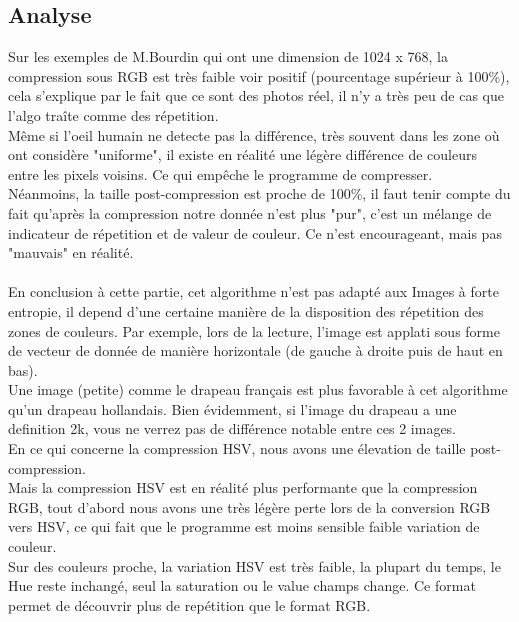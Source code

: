 \documentclass[12pt, letterpaper]{article}
\begin{document}
\subsection{Analyse}
\hspace{1cm}Sur les exemples de M.Bourdin qui ont une dimension de 1024 x 768, la compression sous RGB est très faible voir positif 
(pourcentage supérieur à 100\%), cela s'explique par le fait que ce sont des photos réel, 
il n'y a très peu de cas que l'algo traîte comme des répetition.\\
Même si l'oeil humain ne detecte pas la différence, très souvent dans les zone où ont considère "uniforme", 
il existe en réalité une légère différence de couleurs entre les pixels voisins. Ce qui empêche le programme de compresser.\\
Néanmoins, la taille post-compression est proche de 100\%, il faut tenir compte du fait qu'après la compression notre donnée n'est 
plus "pur", c'est un mélange de indicateur de répetition et de valeur de couleur. Ce n'est encourageant, mais pas "mauvais" en réalité.\\
\\\hspace{1cm}En conclusion à cette partie, cet algorithme n'est pas adapté aux Images à forte entropie, il depend 
d'une certaine manière de la disposition des répetition des zones de couleurs. 
Par exemple, lors de la lecture, l'image est applati sous forme de vecteur de donnée de manière horizontale 
(de gauche à droite puis de haut en bas).\\
Une image (petite) comme le drapeau français est plus favorable à cet algorithme 
qu'un drapeau hollandais. Bien évidemment, si l'image du drapeau a une definition 2k, vous ne verrez pas de différence notable 
entre ces 2 images.
\break
\\
En ce qui concerne la compression HSV, nous avons une élevation de taille post-compression.\\
Mais la compression HSV est en réalité plus performante que la compression RGB, 
tout d'abord nous avons une très légère perte lors de la conversion RGB vers HSV, ce qui fait que 
le programme est moins sensible faible variation de couleur.\\
Sur des couleurs proche, la variation HSV est très faible, la plupart du temps, le Hue reste inchangé, 
seul la saturation ou le value champs change. Ce format permet de découvrir plus de repétition que le format RGB.\\
\\
\end{document}
